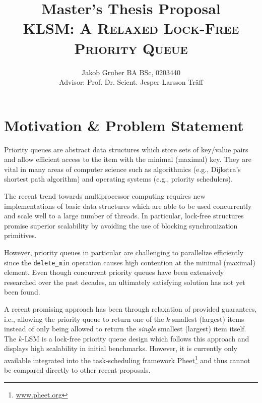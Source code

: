\documentclass[a4paper,11pt]{article}
\title{Master's Thesis Proposal \\
       \textsc{KLSM: A Relaxed Lock-Free Priority Queue}}
\author{Jakob Gruber BA BSc, 0203440 \\
        Advisor: Prof. Dr. Scient. Jesper Larsson Tr\"aff}
\begin{document}
\maketitle

\begin{comment}
http://www.informatik.tuwien.ac.at/dekanat/abschluss-master

Der Anmeldung der Diplomarbeit ist ein Abstract beizufügen. Das Abstract muss strukturiert in
i) Problemstellung,
ii) erwartetes Resultat,
iii) methodisches Vorgehen,
iv) State-of-the art (inkl. mind. vier Literaturreferenzen) sowie
v) Bezug zum angeführten Studium
abgefasst werden.

Bsp 1: http://www.informatik.tuwien.ac.at/dekanat/Abstract1.pdf
Bsp 2: http://www.informatik.tuwien.ac.at/dekanat/Abstract2.pdf
\end{comment}

\section{Motivation \& Problem Statement}

Priority queues are abstract data structures which store sets of key/value
pairs and allow efficient access to the item with the minimal (maximal) key.
They are vital in many areas of computer science such as
algorithmics (e.g., Dijkstra's shortest path algorithm) and operating systems
(e.g., priority schedulers).

The recent trend towards multiprocessor computing requires new implementations
of basic data structures which are able to be used concurrently and scale well
to a large number of threads. In particular, lock-free structures promise
superior scalability by avoiding the use of blocking synchronization
primitives.

However, priority queues in particular are challenging to parallelize
efficiently since the \lstinline|delete_min| operation causes high contention
at the minimal (maximal) element.  Even though concurrent priority queues have
been extensively researched over the past decades, an ultimately satisfying
solution has not yet been found.

A recent promising approach has been through relaxation of provided guarantees,
i.e.,  allowing the priority queue to return one of the $k$ smallest (largest) items
instead of only being allowed to return the \emph{single} smallest (largest) item itself. The $k$-LSM is
a lock-free priority queue design which follows this approach and displays high
scalability in initial benchmarks. However, it is currently only available
integrated into the task-scheduling framework
Pheet\footnote{\url{www.pheet.org}} and thus cannot be compared directly to
other recent proposals.
\end{document}
